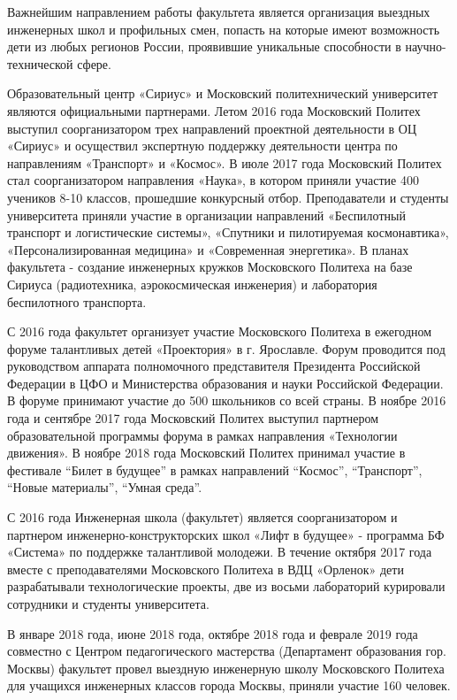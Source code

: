 Важнейшим направлением работы факультета является организация выездных инженерных школ и профильных смен, попасть на которые имеют возможность дети из любых регионов России, проявившие уникальные способности в научно-технической сфере.

Образовательный центр «Сириус» и Московский политехнический университет являются официальными партнерами. Летом 2016 года Московский Политех выступил соорганизатором трех направлений проектной деятельности в ОЦ «Сириус» и осуществил экспертную поддержку деятельности центра по направлениям «Транспорт» и «Космос». В июле 2017 года Московский Политех стал соорганизатором направления «Наука», в котором приняли участие 400 учеников 8-10 классов, прошедшие конкурсный отбор. Преподаватели и студенты университета приняли участие в организации направлений «Беспилотный транспорт и логистические системы», «Спутники и пилотируемая космонавтика», «Персонализированная медицина» и «Современная энергетика». В планах факультета - создание инженерных кружков Московского Политеха на базе Сириуса (радиотехника, аэрокосмическая инженерия) и лаборатория беспилотного транспорта.

С 2016 года факультет организует участие Московского Политеха в ежегодном форуме талантливых детей «Проектория» в г. Ярославле. Форум проводится под руководством аппарата полномочного представителя Президента Российской Федерации в ЦФО и Министерства образования и науки Российской Федерации. В форуме принимают участие до 500 школьников со всей страны. В ноябре 2016 года и сентябре 2017 года Московский Политех выступил партнером образовательной программы форума в рамках направления «Технологии движения». В ноябре 2018 года Московский Политех принимал участие в фестивале “Билет в будущее” в рамках направлений “Космос”, “Транспорт”, “Новые материалы”, “Умная среда”.

С 2016 года Инженерная школа (факультет) является соорганизатором и партнером инженерно-конструкторских школ «Лифт в будущее» - программа БФ «Система» по поддержке талантливой молодежи. В течение октября 2017 года вместе с преподавателями Московского Политеха в ВДЦ «Орленок» дети разрабатывали технологические проекты, две из восьми лабораторий курировали сотрудники и студенты университета.

В январе 2018 года, июне 2018 года, октябре 2018 года и феврале 2019 года совместно с Центром педагогического мастерства (Департамент образования гор. Москвы) факультет провел выездную инженерную школу Московского Политеха для учащихся инженерных классов города Москвы, приняли участие 160 человек.

